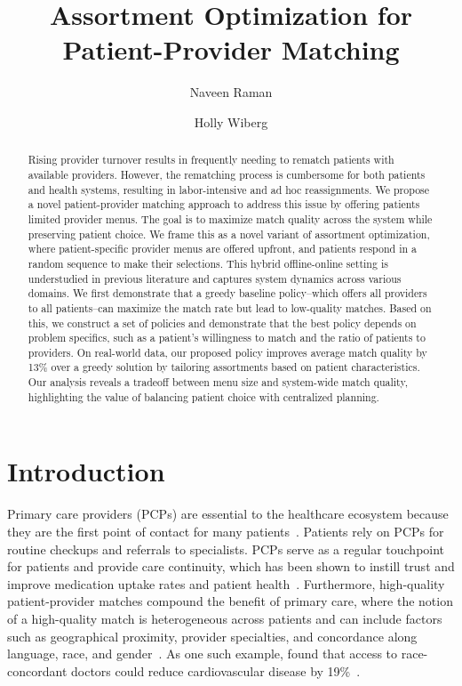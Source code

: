 \documentclass[11pt]{article}
\title{Assortment Optimization for Patient-Provider Matching}
\author[1]{Naveen Raman}
\author[1]{Holly Wiberg}
\date{}
\affil[1]{Carnegie Mellon University}
\affil[1]{\texttt{\{naveenr, hwiberg\}@cmu.edu}}
\begin{document}
 \maketitle
\newif\ifshowdetails
\showdetailstrue  %


\begin{abstract}
Rising provider turnover results in frequently needing to rematch patients with available providers. 
However, the rematching process is cumbersome for both patients and health systems, resulting in labor-intensive and ad hoc reassignments. 
We propose a novel patient-provider matching approach to address this issue by offering patients limited provider menus. The goal is to maximize match quality across the system while preserving patient choice. 
We frame this as a novel variant of assortment optimization, where patient-specific provider menus are offered upfront, and patients respond in a random sequence to make their selections. 
This hybrid offline-online setting is understudied in previous literature and captures system dynamics across various domains. 
We first demonstrate that a greedy baseline policy--which offers all providers to all patients--can maximize the match rate but lead to low-quality matches. 
Based on this, we construct a set of policies and demonstrate that the best policy depends on problem specifics, such as a patient's willingness to match and the ratio of patients to providers. 
On real-world data, our proposed policy improves average match quality by 13\% over a greedy solution by tailoring assortments based on patient characteristics. 
Our analysis reveals a tradeoff between menu size and system-wide match quality, highlighting the value of balancing patient choice with centralized planning. 
\end{abstract}


\section{Introduction}
\label{sec:intro}
Primary care providers (PCPs) are essential to the healthcare ecosystem because they are the first point of contact for many patients~\citep{physician_trust,physician_trust_adherence}. 
Patients rely on PCPs for routine checkups and referrals to specialists. PCPs serve as a regular touchpoint for patients and provide care continuity, which has been shown to instill trust and improve medication uptake rates and patient health~\citep{physician_trust_adherence}. Furthermore, high-quality patient-provider matches compound the benefit of primary care, where the notion of a high-quality match is heterogeneous across patients and can include factors such as geographical proximity, provider specialties, and concordance along language, race, and gender~\citep{race_concordance,gender_concordance,language_concordance}. As one such example, \citet{concordance_race_cardio} found that access to race-concordant doctors could reduce cardiovascular disease by 19\%~\citep{concordance_race_cardio}. 
\end{document}
